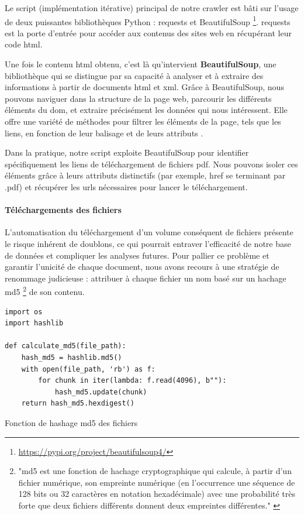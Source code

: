 Le script (implémentation itérative) principal de notre crawler est bâti sur l'usage de deux puissantes bibliothèques Python : requests et BeautifulSoup \footnote{\href{https://pypi.org/project/beautifulsoup4/}{https://pypi.org/project/beautifulsoup4/}}. requests  est la porte d'entrée pour accéder aux contenus des sites web en récupérant leur code \ac{html}.

Une fois le contenu \ac{html} obtenu, c'est là qu'intervient \textbf{BeautifulSoup}, une bibliothèque qui se distingue par sa capacité à analyser et à extraire des informations à partir de documents \ac{html} et \ac{xml}. Grâce à BeautifulSoup, nous pouvons naviguer dans la structure de la page web, parcourir les différents éléments du \ac{dom}, et extraire précisément les données qui nous intéressent. Elle offre une variété de méthodes pour filtrer les éléments de la page, tels que les liens, en fonction de leur balisage et de leurs attributs \cite{frwiki:203869267}.

Dans la pratique, notre script exploite BeautifulSoup pour identifier spécifiquement les liens de téléchargement de fichiers \ac{pdf}. Nous pouvons isoler ces éléments grâce à leurs attributs distinctifs (par exemple, href se terminant par .pdf) et récupérer les \acs{url}s nécessaires pour lancer le téléchargement.

\paragraph{Téléchargements des fichiers} \hspace{0pt}

L'automatisation du téléchargement d'un volume conséquent de fichiers présente le risque inhérent de doublons, ce qui pourrait entraver l'efficacité de notre base de données et compliquer les analyses futures. Pour pallier ce problème et garantir l'unicité de chaque document, nous avons recours à une stratégie de renommage judicieuse : attribuer à chaque fichier un nom basé sur un hachage \ac{md5} \footnote{"\ac{md5} est une fonction de hachage cryptographique qui calcule, à partir d'un fichier numérique, son empreinte numérique (en l'occurrence une séquence de 128 bits ou 32 caractères en notation hexadécimale) avec une probabilité très forte que deux fichiers différents donnent deux empreintes différentes." \cite{frwiki:203545836}} de son contenu.

\begin{listing}[!ht]
\begin{verbatim}
import os
import hashlib

def calculate_md5(file_path):
    hash_md5 = hashlib.md5()
    with open(file_path, 'rb') as f:
        for chunk in iter(lambda: f.read(4096), b""):
            hash_md5.update(chunk)
    return hash_md5.hexdigest()
\end{verbatim}
\caption{Fonction de hashage \ac{md5} des fichiers}
\label{appendix:code:python:md5-hashing}
\end{listing}

